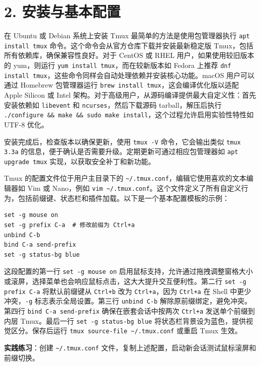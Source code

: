 \chapter{2. 安装与基本配置}
在 Ubuntu 或 Debian 系统上安装 Tmux 最简单的方法是使用包管理器执行 \texttt{apt install tmux} 命令。这个命令会从官方仓库下载并安装最新稳定版 Tmux，包括所有依赖库，确保兼容性良好。对于 CentOS 或 RHEL 用户，如果使用较旧版本的 yum，则运行 \texttt{yum install tmux}，而在较新版本如 Fedora 上推荐 \texttt{dnf install tmux}，这些命令同样会自动处理依赖并安装核心功能。macOS 用户可以通过 Homebrew 包管理器运行 \texttt{brew install tmux}，这会编译优化版以适配 Apple Silicon 或 Intel 架构。对于高级用户，从源码编译提供最大自定义性：首先安装依赖如 \texttt{libevent} 和 \texttt{ncurses}，然后下载源码 tarball，解压后执行 \texttt{./configure \&{}\&{} make \&{}\&{} sudo make install}，这个过程允许启用实验性特性如 UTF-8 优化。\par
安装完成后，检查版本以确保更新，使用 \texttt{tmux -V} 命令，它会输出类似 \texttt{tmux 3.3a} 的信息，便于确认是否需要升级。定期更新可通过相应包管理器如 \texttt{apt upgrade tmux} 实现，以获取安全补丁和新功能。\par
Tmux 的配置文件位于用户主目录下的 \texttt{\~{}/.tmux.conf}，编辑它使用喜欢的文本编辑器如 Vim 或 Nano，例如 \texttt{vim \~{}/.tmux.conf}。这个文件定义了所有自定义行为，包括前缀键、状态栏和插件加载。以下是一个基本配置模板的示例：\par
\begin{lstlisting}
set -g mouse on
set -g prefix C-a  # 修改前缀为 Ctrl+a
unbind C-b
bind C-a send-prefix
set -g status-bg blue
\end{lstlisting}
这段配置的第一行 \texttt{set -g mouse on} 启用鼠标支持，允许通过拖拽调整窗格大小或滚屏，选择菜单也会响应鼠标点击，这大大提升交互便利性。第二行 \texttt{set -g prefix C-a} 将默认前缀键从 \texttt{Ctrl+b} 改为 \texttt{Ctrl+a}，因为 \texttt{Ctrl+a} 在 Shell 中更少冲突，\texttt{-g} 标志表示全局设置。第三行 \texttt{unbind C-b} 解除原前缀绑定，避免冲突。第四行 \texttt{bind C-a send-prefix} 确保在嵌套会话中按两次 \texttt{Ctrl+a} 发送单个前缀到内层 Tmux。最后一行 \texttt{set -g status-bg blue} 将状态栏背景设为蓝色，提供视觉区分。保存后运行 \texttt{tmux source-file \~{}/.tmux.conf} 或重启 Tmux 生效。\par
\textbf{实践练习}：创建 \texttt{\~{}/.tmux.conf} 文件，复制上述配置，启动新会话测试鼠标滚屏和前缀切换。\par
